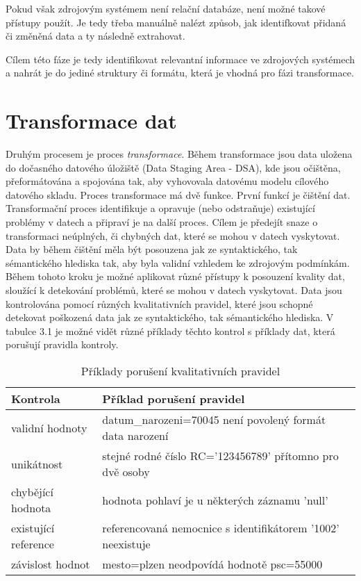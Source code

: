Pokud však zdrojovým systémem není relační databáze, není možné takové přístupy použít. Je tedy třeba manuálně nalézt způsob, jak identifkovat přidaná či změněná data a ty následně extrahovat.

Cílem této fáze je tedy identifikovat relevantní informace ve zdrojových systémech a nahrát je do jediné struktury či formátu, která je vhodná pro fázi transformace. 

\section{Transformace dat}

Druhým procesem je proces \textit{transformace}. Během transformace jsou data uložena do dočasného datového úložiště (Data Staging Area - DSA), kde jsou očištěna, přeformátována a spojována tak, aby vyhovovala datovému modelu cílového datového skladu. Proces transformace má dvě funkce. První funkcí je čištění dat. Transformační proces identifikuje a opravuje (nebo odstraňuje) existující problémy v datech a připraví je na další proces. Cílem je předejít snaze o transformaci neúplných, či chybných dat, které se mohou v datech vyskytovat. Data by během čištění měla být posouzena jak ze syntaktického, tak sémantického hlediska tak, aby byla validní vzhledem ke zdrojovým podmínkám. Během tohoto kroku je možné aplikovat různé přístupy k posouzení kvality dat, sloužící k detekování problémů, které se mohou v datech vyskytovat. Data jsou kontrolována pomocí různých kvalitativních pravidel, které jsou schopné detekovat poškozená data jak ze syntaktického, tak sémantického hlediska. V tabulce 3.1 je možné vidět různé příklady těchto kontrol s příklady dat, která porušují pravidla kontroly. 

\begin{table}[]
\begin{tabular}{|l|l|}
\hline
\textbf{Kontrola}    & \textbf{Příklad porušení pravidel}                          \\ \hline
validní hodnoty      & datum\_narozeni=70045 není povolený formát data narození    \\ \hline
unikátnost           & stejné rodné číslo RC='123456789' přítomno pro dvě osoby    \\ \hline
chybějící hodnota    & hodnota pohlaví je u některých záznamu 'null'               \\ \hline
existující reference & referencovaná nemocnice s identifikátorem '1002' neexistuje \\ \hline
závislost hodnot     & mesto=plzen neodpovídá hodnotě psc=55000                    \\ \hline
\end{tabular}
\caption{Příklady porušení kvalitativních pravidel}
\end{table}

